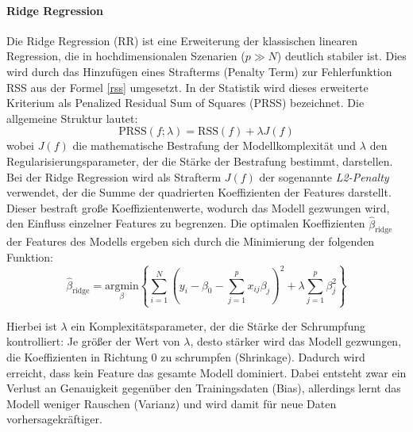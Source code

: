 \paragraph{Ridge Regression} \label{ridge}
Die Ridge Regression (RR) ist eine Erweiterung der klassischen linearen Regression, die in hochdimensionalen Szenarien ($p \gg N$) deutlich stabiler ist. Dies wird durch das Hinzufügen eines Strafterms (Penalty Term) zur Fehlerfunktion RSS aus der Formel \ref{rss} umgesetzt. In der Statistik wird dieses erweiterte Kriterium als Penalized Residual Sum of Squares (PRSS) bezeichnet. Die allgemeine Struktur lautet:
\begin{equation}
  \text{PRSS}(f; \lambda) = \text{RSS}(f) + \lambda J(f)
\end{equation} \cite[S.~34]{tesl} wobei $J(f)$ die mathematische Bestrafung der Modellkomplexität und $\lambda$ den Regularisierungsparameter, der die Stärke der Bestrafung bestimmt, darstellen. Bei der Ridge Regression wird als Strafterm $J(f)$ der sogenannte \textit{L2-Penalty} verwendet, der die Summe der quadrierten Koeffizienten der Features darstellt. Dieser bestraft große Koeffizientenwerte, wodurch das Modell gezwungen wird, den Einfluss einzelner Features zu 
begrenzen. Die optimalen Koeffizienten $\hat{\beta}_{\text{ridge}}$ der Features des Modells ergeben sich durch die Minimierung der folgenden Funktion:
\begin{equation} 
  \hat{\beta}_{\text{ridge}} = \underset{\beta}{\text{argmin}} \left\{\sum_{i=1}^{N} \left( y_i - \beta_0 - \sum_{j=1}^{p} x_{ij}\beta_j \right)^2 + \lambda \sum_{j=1}^{p} \beta_j^2 \right\}
\end{equation} 
\cite[S.~62]{tesl}

Hierbei ist $\lambda$ ein Komplexitätsparameter, der die Stärke der Schrumpfung kontrolliert: Je größer der Wert von $\lambda$, desto stärker wird das Modell gezwungen, die Koeffizienten in Richtung $0$ zu schrumpfen (Shrinkage). Dadurch wird erreicht, dass kein Feature das gesamte Modell dominiert. Dabei entsteht zwar ein Verlust an Genauigkeit gegenüber den Trainingsdaten (Bias), allerdings lernt das Modell weniger Rauschen (Varianz) und wird damit für neue Daten vorhersagekräftiger. \cite[S.~63f.]{tesl}

